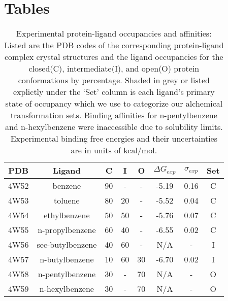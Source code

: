 \section*{Tables}

\begin{table}[!htb]
\centering
\caption{Experimental protein-ligand occupancies and affinities: 
Listed are the PDB codes of the corresponding protein-ligand complex crystal structures and the ligand occupancies\cite{Merski2015} for the closed(C), intermediate(I), and open(O) protein conformations by percentage. 
Shaded in grey or listed explictly under the `Set' column is each ligand's primary state of occupancy which we use to categorize our alchemical transformation sets.
Binding affinities for n-pentylbenzene and n-hexylbenzene were inaccessible due to solubility limits\cite{Merski2015}. 
Experimental binding free energies and their uncertainties are in units of kcal/mol\cite{T4affinity}.
}
\label{tbl:expdata}
\begin{tabular}{|c|c|c|c|c|c|c|c|}
\hline
\textbf{PDB}  & \textbf{Ligand} & \textbf{C} & \textbf{I} & \textbf{O} & \boldmath$\Delta G_{exp}$  & \boldmath$\sigma_{exp}$ &  \textbf{Set} \\ \hline
4W52   &  benzene          & \cellcolor[HTML]{C0C0C0}90   & -     & -    & -5.19      & 0.16       &  C             \\ \hline
4W53   &  toluene          & \cellcolor[HTML]{C0C0C0}80   & 20   & -    & -5.52      & 0.04       & C   \\ \hline
4W54   &  ethylbenzene     & \cellcolor[HTML]{C0C0C0}50    & 50   & -    & -5.76      & 0.07       & C   \\ \hline
4W55   &  n-propylbenzene  & \cellcolor[HTML]{C0C0C0}60    & 40   & -    & -6.55      & 0.02       & C   \\ \hline
4W56   &  sec-butylbenzene & 40        & \cellcolor[HTML]{C0C0C0}60      & -    & N/A      & -     &  I   \\ \hline
4W57   &  n-butylbenzene   & 10        & \cellcolor[HTML]{C0C0C0}60      & 30   & -6.70   & 0.02  &  I   \\ \hline
4W58   &  n-pentylbenzene  & 30        &  -       & \cellcolor[HTML]{C0C0C0}70  & N/A     & -      &  O   \\ \hline
4W59   &  n-hexylbenzene   & 30        &  -       & \cellcolor[HTML]{C0C0C0}70  & N/A     & -     & O   \\ \hline
\end{tabular}
\end{table}


